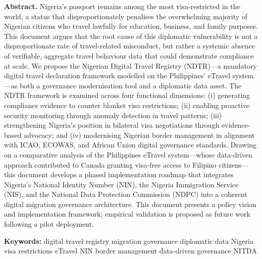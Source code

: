 \documentclass[11pt]{article}
\begin{document}
\noindent\colorbox{primary-blue!7}{%
\begin{minipage}{\dimexpr\textwidth-2\fboxsep}
\vspace{6pt}
\textbf{\color{primary-blue}Abstract.}\quad
Nigeria's passport remains among the most visa-restricted in the world, a status that
disproportionately penalises the overwhelming majority of Nigerian citizens who travel
lawfully for education, business, and family purposes.
This document argues that the root cause of this diplomatic vulnerability is not a
disproportionate rate of travel-related misconduct, but rather a systemic absence of
verifiable, aggregate travel behaviour data that could demonstrate compliance at scale.
We propose the Nigerian Digital Travel Registry (NDTR)---a mandatory digital travel
declaration framework modelled on the Philippines' eTravel system---as both a governance
modernisation tool and a diplomatic data asset.
The NDTR framework is examined across four functional dimensions:
(i) generating compliance evidence to counter blanket visa restrictions;
(ii) enabling proactive security monitoring through anomaly detection in travel patterns;
(iii) strengthening Nigeria's position in bilateral visa negotiations through
evidence-based advocacy; and
(iv) modernising Nigerian border management in alignment with ICAO, ECOWAS,
and African Union digital governance standards.
Drawing on a comparative analysis of the Philippines eTravel system---whose
data-driven approach contributed to Canada granting visa-free access to Filipino
citizens---this document develops a phased implementation roadmap that integrates
Nigeria's National Identity Number (NIN), the Nigeria Immigration Service (NIS),
and the National Data Protection Commission (NDPC) into a coherent digital migration
governance architecture.
This document presents a policy vision and implementation framework; empirical
validation is proposed as future work following a pilot deployment.
\vspace{4pt}

\textbf{\color{primary-blue}Keywords:}\quad
digital travel registry \textbf{\textperiodcentered} migration governance
\textbf{\textperiodcentered} diplomatic data \textbf{\textperiodcentered} Nigeria
\textbf{\textperiodcentered} visa restrictions \textbf{\textperiodcentered} eTravel
\textbf{\textperiodcentered} NIN \textbf{\textperiodcentered} border management
\textbf{\textperiodcentered} data-driven governance \textbf{\textperiodcentered} NITDA
\vspace{6pt}
\end{minipage}}
\end{document}
